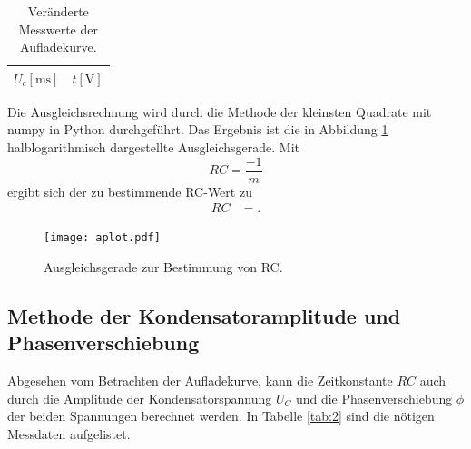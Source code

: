 \begin{table}[H]
  \centering
  \caption{Veränderte Messwerte der Aufladekurve.}
  \label{tab:werte_a_neu}
  \begin{tabular}{c c}
    \toprule
    {$U_c [\si{\milli\second}]$} & {$t [\si{\volt}]$}\\
    \midrule
    
    \bottomrule
  \end{tabular}
\end{table}

Die Ausgleichsrechnung wird durch die Methode der kleinsten Quadrate mit numpy in Python durchgeführt.
Das Ergebnis ist die in Abbildung \ref{fig:plot_a} halblogarithmisch dargestellte Ausgleichsgerade.
Mit
\begin{equation}
  RC = \frac{-1}{m}
\end{equation}
ergibt sich der zu bestimmende RC-Wert zu
\begin{align}
  RC &= .
\end{align}
\begin{figure}[H]
  \centering
  \texttt{[image: aplot.pdf]}
  \caption{Ausgleichsgerade zur Bestimmung von RC.}
  \label{fig:plot_a}
\end{figure}

\subsection{Methode der Kondensatoramplitude und Phasenverschiebung}
Abgesehen vom Betrachten der Aufladekurve, kann die Zeitkonstante $RC$ auch durch die Amplitude der Kondensatorspannung $U_C$ und die Phasenverschiebung $\phi$ der beiden Spannungen berechnet werden.
In Tabelle \ref{tab:2} sind die nötigen Messdaten aufgelistet.
%
%    
%

